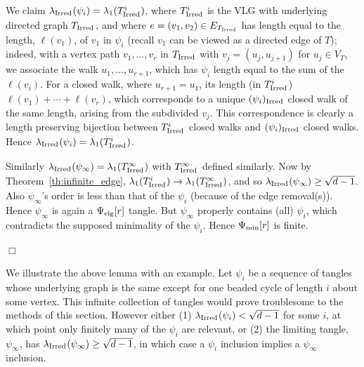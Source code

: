 \documentclass[12pt]{article}
\newcommand{\tang}{{\psi}}	%
\newcommand{\tset}{{\Psi}}
\newcommand{\tseig}{{\tset_{\rm eig}}}
\newcommand{\tsmin}{{\tset_{\rm min}}}
\newcommand{\proofbox}{\begin{flushright}$\Box$\end{flushright}}
\newcommand{\ird}[1]{{\rm Irred}_{#1}}
\begin{document}
We claim $\lambda_{\ird{}}(\tang_i)=\lambda_1(T_{\ird{}}^i)$, where
$T_{\ird{}}^i$ is the VLG with underlying directed graph $T_{\ird{}}$,
and where $e=(v_1,v_2)\in E_{T_{\ird{}}}$ has length equal to the length,
$\ell(v_1)$,
of $v_1$ in $\tang_i$ (recall $v_1$ can be viewed as a directed edge of
$T$); indeed, with a vertex path $v_1,\ldots,v_r$ in $T_{\ird{}}$ with
$v_j=(u_j,u_{j+1})$ for $u_j\in V_T$, we associate the walk
$u_1,\ldots,u_{r+1}$, which has $\tang_i$ length equal to the sum of
the $\ell(v_i)$.
For a closed walk, where $u_{r+1}=u_1$, its length (in $T_{\ird{}}^i$)
$\ell(v_1)+\cdots+\ell(v_r)$, which corresponds to a unique 
$(\tang_i)_{\ird{}}$ closed walk of the same length, arising from
the subdivided $v_j$.  This correspondence is clearly a length preserving
bijection between $T_{\ird{}}^i$ closed walks and $(\tang_i)_{\ird{}}$ closed walks.
Hence $\lambda_{\ird{}}(\tang_i)=\lambda_1(T_{\ird{}}^i)$.


Similarly $\lambda_{\ird{}}(\tang_\infty)=\lambda_1(T_{\ird{}}^\infty)$
with $T_{\ird{}}^\infty$ defined similarly.  Now by 
Theorem~\ref{th:infinite_edge}, $\lambda_1(T_{\ird{}}^i)\to
\lambda_1(T_{\ird{}}^\infty)$, and so
$\lambda_{\ird{}}(\tang_\infty)\ge \sqrt{d-1}$.  Also $\tang_\infty$'s
order is less than that of the $\tang_i$ (because of the edge removal(s)).
Hence
$\tang_\infty$ is again a $\tseig[r]$ tangle.
But $\tang_\infty$ properly
contains (all) $\tang_i$, which contradicts the supposed
minimality of
the $\tang_i$.
Hence $\tsmin[r]$ is finite.
\proofbox
We illustrate the above lemma with an example.  Let $\tang_i$ be a
sequence of tangles whose underlying graph is the same except for one
beaded cycle of length $i$ about some vertex.  
This infinite collection of tangles would prove troublesome
to the methods of this section.
However either (1) $\lambda_{\ird{}}(\tang_i)<\sqrt{d-1}$ for some $i$,
at which point only finitely many of the $\tang_i$ are relevant,
or (2) the limiting tangle, $\tang_\infty$, has
$\lambda_{\ird{}}(\tang_\infty)\ge\sqrt{d-1}$, in which case a $\tang_i$
inclusion implies a $\tang_\infty$ inclusion.
\end{document}
